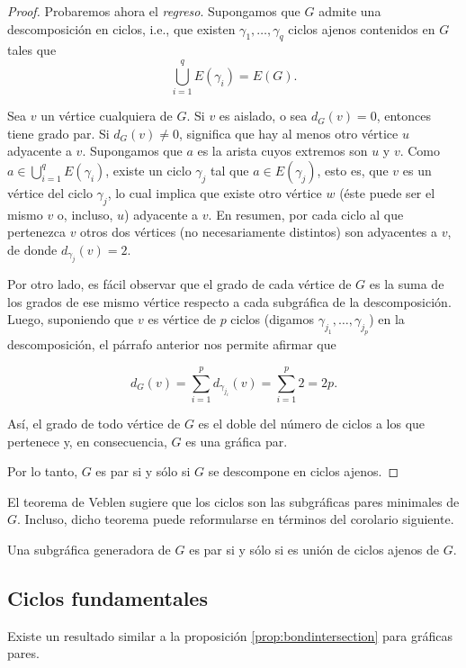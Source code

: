 \begin{proof}
Probaremos ahora el \textit{regreso}. Supongamos que $G$ admite una descomposición en ciclos, i.e., que existen $\gamma_{1}, \ldots, \gamma_{q}$ ciclos ajenos contenidos en $G$ tales que 
$$
\bigcup_{i=1}^{q} E(\gamma_{i}) = E(G).
$$

Sea $v$ un vértice cualquiera de $G$. Si $v$ es aislado, o sea $d_{G}(v)=0$, entonces tiene grado par. Si $d_{G}(v)\neq 0$, significa que hay al menos otro vértice $u$ adyacente a $v$. Supongamos que $a$ es la arista cuyos extremos son $u$ y $v$. Como $a \in \bigcup_{i=1}^{q} E(\gamma_{i})$, existe un ciclo $\gamma_{j}$ tal que $a \in E(\gamma_{j})$, esto es, que $v$ es un vértice del ciclo $\gamma_{j}$, lo cual implica que existe otro vértice $w$ (éste puede ser el mismo $v$ o, incluso, $u$) adyacente a $v$. En resumen, por cada ciclo al que pertenezca $v$ otros dos vértices (no necesariamente distintos) son adyacentes a $v$, de donde $d_{\gamma_{j}}(v) = 2$. 

Por otro lado, es fácil observar que el grado de cada vértice de $G$ es la suma de los grados de ese mismo vértice respecto a cada subgráfica de la descomposición. Luego, suponiendo que $v$ es vértice de $p$ ciclos (digamos $\gamma_{j_{1}}, \ldots, \gamma_{j_{p}}$) en la descomposición, el párrafo anterior nos permite afirmar que

$$
d_{G}(v) = \sum_{i=1}^{p}d_{\gamma_{j_{i}}}(v)=\sum_{i=1}^{p}2=2p.
$$

Así, el grado de todo vértice de $G$ es el doble del número de ciclos a los que pertenece y, en consecuencia, $G$ es una gráfica par. 

Por lo tanto, $G$ es par si y sólo si $G$ se descompone en ciclos ajenos.

\end{proof}

El teorema de Veblen sugiere que los ciclos son las subgráficas pares minimales de $G$. Incluso, dicho teorema puede reformularse en términos del corolario siguiente.

\begin{cor}\label{teo:veblen2}
Una subgráfica generadora de $G$ es par si y sólo si es unión de ciclos ajenos de $G$.
 \end{cor}


\subsection{Ciclos fundamentales}
Existe un resultado similar a la proposición \ref{prop:bondintersection} para gráficas pares.

